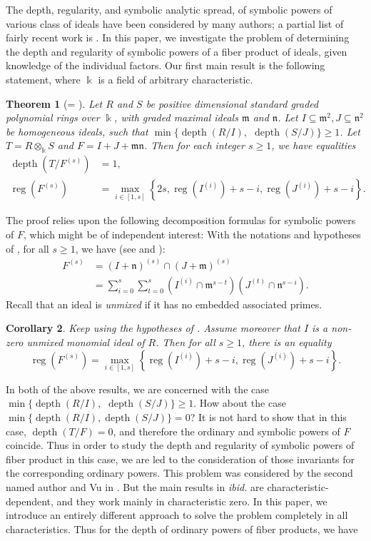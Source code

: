 \documentclass{amsart}
\DeclareMathOperator{\depth}{depth}
\DeclareMathOperator{\reg}{reg}
\newcommand{\mm}{\mathfrak{m}}
\newcommand{\nn}{\mathfrak{n}}
\theoremstyle{plain}
\newtheorem{thm}{Theorem}[section]
\newtheorem{cor}[thm]{Corollary}
\theoremstyle{definition}
\numberwithin{equation}{section}
\newcommand{\kk}{\Bbbk}
\begin{document}
The depth, regularity, and symbolic analytic spread, of symbolic powers of various class of ideals have been considered by many authors; a partial list of fairly recent work is \cite{DM21, DHNT, HJKN, HKTT, HNTT, JK20, MNPTV21, MT19, MTV24, MV24, NgT19, OR19, SF18, SF19, SF20, SF24}. In this paper, we investigate the problem of determining  the depth and regularity of symbolic powers of a fiber product of ideals, given knowledge of the individual factors. Our first main result is the following statement, where $\kk$ is a field of arbitrary characteristic.
\begin{thm}[= ]
\label{thm_main}
Let $R$ and $S$ be positive dimensional standard graded polynomial rings over $\kk$, with graded maximal ideals $\mm$ and $\nn$. Let $I\subseteq \mm^2, J\subseteq \nn^2$ be homogeneous ideals, such that $\min\{\depth(R/I),$ $\depth(S/J)\}\ge 1$. Let $T=R\otimes_\kk S$ and $F=I+J+\mm \nn$. Then for each integer $s\ge 1$, we have equalities
\begin{align*}
\depth(T/F^{(s)}) &=1,\\
\reg(F^{(s)})   &=\max\limits_{i\in [1,s]} \left\{2s,\reg(I^{(i)})+s-i, \reg(J^{(i)})+s-i\right \}.
\end{align*}
\end{thm}
The proof relies upon the following decomposition formulas for symbolic powers of $F$, which might be of independent interest: With the notations and hypotheses of , for all $s\ge 1$, we have (see  and ):
\begin{align*}
F^{(s)}&=(I+\nn)^{(s)} \cap (J+\mm)^{(s)}\\
       &=\sum_{i=0}^s\sum_{t=0}^s (I^{(i)}\cap \mm^{s-t})(J^{(t)}\cap \nn^{s-i}). 
\end{align*}
Recall that an ideal is \emph{unmixed} if it has no embedded associated primes.
\begin{cor}
\label{cor_main_regunmixedcase}
Keep using the hypotheses of . Assume moreover that $I$ is a non-zero unmixed monomial ideal of $R$. Then for all $s\ge 1$, there is an equality
$$
\reg (F^{(s)})=\max \limits_{i\in [1,s]} \left\{\reg(I^{(i)})+s-i, \reg(J^{(i)})+s-i \right\}.
$$
\end{cor}
In both of the above results, we are concerned with the case $\min\{\depth(R/I),$ $\depth(S/J)\}\ge 1$. How about the case $\min\{\depth(R/I), \depth(S/J)\}=0$? It is not hard to show that in this case, $\depth(T/F)=0$, and therefore the ordinary and symbolic powers of $F$ coincide. Thus in order to study the depth and regularity of symbolic powers of fiber product in this case, we are led to the consideration of those invariants for the corresponding ordinary powers. This problem was considered by the second named author and Vu in \cite{NgV19b}. But the main results in \emph{ibid.} are characteristic-dependent, and they work mainly in characteristic zero. In this paper, we introduce an entirely different approach to solve the problem completely in all characteristics. Thus for the depth of ordinary powers of fiber products, we have
\end{document}
